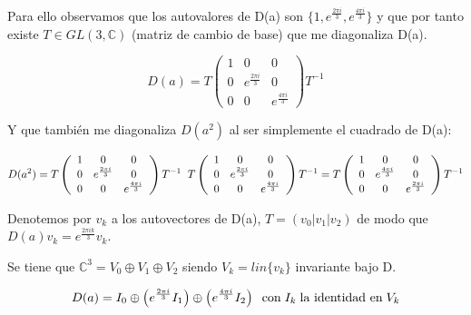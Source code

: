 \documentclass{article}
\begin{document}
\smallskip
Para ello observamos que los autovalores de D(a) son $\lbrace 1,e^{\frac{2\pi i}{3}}, e^{\frac{4\pi i}{3}}\rbrace$ y que por tanto existe $T\in GL(3,\mathds{C})$ (matriz de cambio de base) que me diagonaliza D(a).
    
    $$D(a)=T\left ( \begin{array}{ccc}
         1 & 0 & 0 \\
         0 & e^{\frac{2\pi i}{3}} & 0 \\
         0 & 0 & e^{\frac{4\pi i}{3}}
    \end{array}\right )T^{-1}$$

Y que también me diagonaliza $D(a^2)$ al ser simplemente el cuadrado de D(a):

$$D(a^2)=T\left ( \begin{array}{ccc}
         1 & 0 & 0 \\
         0 & e^{\frac{2\pi i}{3}} & 0 \\
         0 & 0 & e^{\frac{4\pi i}{3}}
    \end{array}\right )T^{-1} \hspace{0.2cm} T\left ( \begin{array}{ccc}
         1 & 0 & 0 \\
         0 & e^{\frac{2\pi i}{3}} & 0 \\
         0 & 0 & e^{\frac{4\pi i}{3}}
    \end{array}\right )T^{-1}=T\left ( \begin{array}{ccc}
         1 & 0 & 0 \\
         0 & e^{\frac{4\pi i}{3}} & 0 \\
         0 & 0 & e^{\frac{2\pi i}{3}}
    \end{array}\right )T^{-1}$$
    
    \smallskip
    Denotemos por $v_k$ a los autovectores de D(a), $T=(v_0 |v_1 | v_2)$ de modo que $D(a)v_k=e^{\frac{2\pi i k}{3}} v_k$.
    
    \smallskip
    Se tiene que $\mathds{C}^3=V_0\oplus V_1 \oplus V_2$ siendo $V_k=lin\lbrace v_k \rbrace$ invariante bajo D. 
    
    $$D(a)=I_0 \oplus \left ( e^{\frac{2\pi i}{3}}I_1\right) \oplus \left( e^{\frac{4\pi i}{3}}I_2\right) \hspace{0.2cm} \text{con} \hspace{0.1cm} I_k \hspace{0.1cm} \text{la identidad en} \hspace{0.1cm} V_k$$
    
\end{document}
